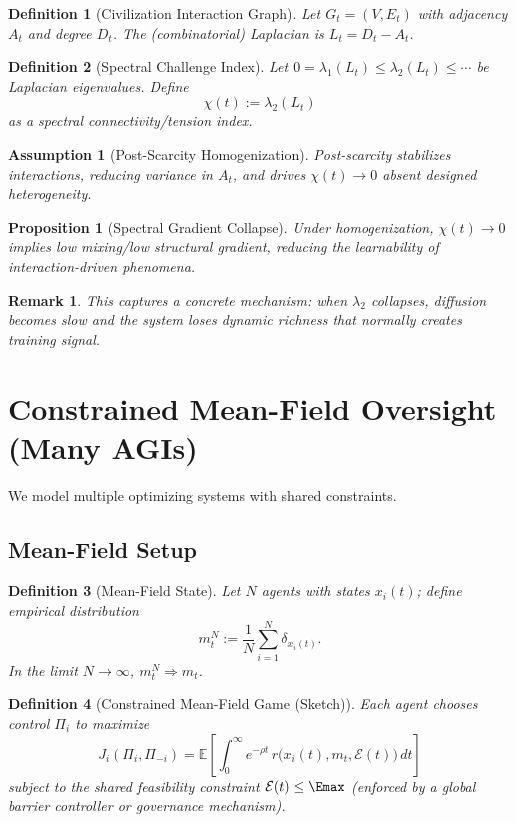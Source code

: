 \documentclass[11pt]{article}
\newtheorem{definition}{Definition}
\newtheorem{assumption}{Assumption}
\newtheorem{proposition}{Proposition}
\newtheorem{remark}{Remark}
\newcommand{\Eenv}{\mathcal{E}}     %
\begin{document}
\begin{definition}[Civilization Interaction Graph]
Let $G_t=(V,E_t)$ with adjacency $A_t$ and degree $D_t$. The (combinatorial) Laplacian is $L_t=D_t-A_t$.
\end{definition}

\begin{definition}[Spectral Challenge Index]
Let $0=\lambda_1(L_t)\le \lambda_2(L_t)\le \cdots$ be Laplacian eigenvalues. Define
\[
\chi(t):=\lambda_2(L_t)
\]
as a spectral connectivity/tension index.
\end{definition}

\begin{assumption}[Post-Scarcity Homogenization]
Post-scarcity stabilizes interactions, reducing variance in $A_t$, and drives $\chi(t)\to 0$ absent designed heterogeneity.
\end{assumption}

\begin{proposition}[Spectral Gradient Collapse]
Under homogenization, $\chi(t)\to 0$ implies low mixing/low structural gradient, reducing the learnability of interaction-driven phenomena.
\end{proposition}

\begin{remark}
This captures a concrete mechanism: when $\lambda_2$ collapses, diffusion becomes slow and the system loses dynamic richness that normally creates training signal.
\end{remark}

\section{Constrained Mean-Field Oversight (Many AGIs)}

We model multiple optimizing systems with shared constraints.

\subsection{Mean-Field Setup}

\begin{definition}[Mean-Field State]
Let $N$ agents with states $x_i(t)$; define empirical distribution
\[
m^N_t := \frac{1}{N}\sum_{i=1}^N \delta_{x_i(t)}.
\]
In the limit $N\to\infty$, $m^N_t \Rightarrow m_t$.
\end{definition}

\begin{definition}[Constrained Mean-Field Game (Sketch)]
Each agent chooses control $\Pi_i$ to maximize
\[
J_i(\Pi_i,\Pi_{-i}) = \mathbb{E}\left[\int_0^\infty e^{-\rho t}\, r\big(x_i(t),m_t,\Eenv(t)\big)\,dt\right]
\]
subject to the shared feasibility constraint $\Eenv(t)\le \Emax$ (enforced by a global barrier controller or governance mechanism).
\end{definition}
\end{document}
